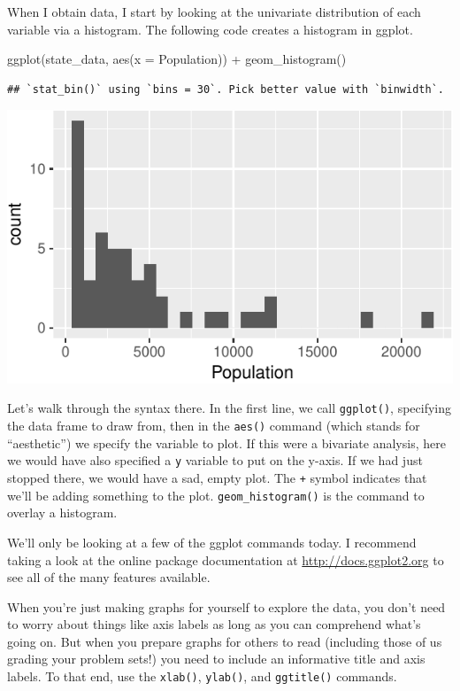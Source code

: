 \documentclass[
  12pt,
  oneside,openany]{book}
\newenvironment{Shaded}{\begin{snugshade}}{\end{snugshade}}
\newcommand{\AttributeTok}[1]{\textcolor[rgb]{0.77,0.63,0.00}{#1}}
\newcommand{\FunctionTok}[1]{\textcolor[rgb]{0.00,0.00,0.00}{#1}}
\newcommand{\NormalTok}[1]{#1}
\newcommand{\SpecialCharTok}[1]{\textcolor[rgb]{0.00,0.00,0.00}{#1}}
\begin{document}
When I obtain data, I start by looking at the univariate distribution of each variable via a histogram. The following code creates a histogram in ggplot.

\begin{Shaded}
\begin{Highlighting}[]
\FunctionTok{ggplot}\NormalTok{(state\_data, }\FunctionTok{aes}\NormalTok{(}\AttributeTok{x =}\NormalTok{ Population)) }\SpecialCharTok{+}
  \FunctionTok{geom\_histogram}\NormalTok{()}
\end{Highlighting}
\end{Shaded}

\begin{verbatim}
## `stat_bin()` using `bins = 30`. Pick better value with `binwidth`.
\end{verbatim}

\includegraphics{pdaps_files/figure-latex/histogram-1.pdf}

Let's walk through the syntax there. In the first line, we call \texttt{ggplot()}, specifying the data frame to draw from, then in the \texttt{aes()} command (which stands for ``aesthetic'') we specify the variable to plot. If this were a bivariate analysis, here we would have also specified a \texttt{y} variable to put on the y-axis. If we had just stopped there, we would have a sad, empty plot. The \texttt{+} symbol indicates that we'll be adding something to the plot. \texttt{geom\_histogram()} is the command to overlay a histogram.

We'll only be looking at a few of the ggplot commands today. I recommend taking a look at the online package documentation at \url{http://docs.ggplot2.org} to see all of the many features available.

When you're just making graphs for yourself to explore the data, you don't need to worry about things like axis labels as long as you can comprehend what's going on. But when you prepare graphs for others to read (including those of us grading your problem sets!) you need to include an informative title and axis labels. To that end, use the \texttt{xlab()}, \texttt{ylab()}, and \texttt{ggtitle()} commands.
\end{document}
